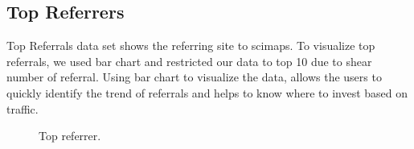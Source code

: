 \subsection{Top Referrers} \label{viztoprefs}
Top Referrals data set shows the referring site to scimaps. To visualize
top referrals, we used bar chart and restricted our data to top 10 due
to shear number of referral. Using bar chart to visualize the data,
allows the users to quickly identify the trend of referrals and helps
to know where to invest based on traffic. 

\begin{figure}
\centering
{}
\caption{Top referrer.}
\label{fig:topreferrer}
\end{figure}


